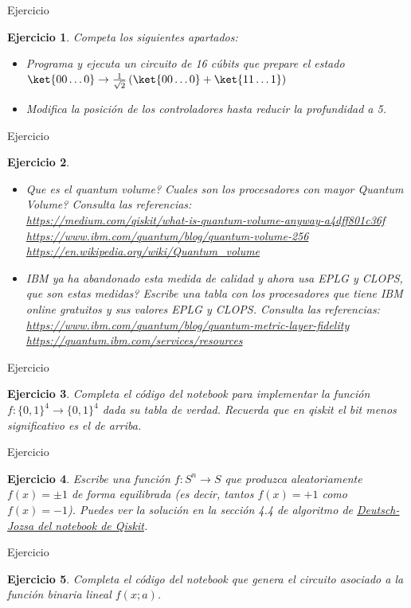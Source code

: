 \documentclass[a4paper,11pt]{book} %
\newtheorem{ejercicio_contador}{Ejercicio}
\newcommand{\Ejercicio}[1]{
		\begin{mybox_gray}{Ejercicio} 
			\begin{ejercicio_contador}
				 #1 
			\end{ejercicio_contador} 
		\end{mybox_gray}
	}
\numberwithin{equation}{chapter}
\begin{document}
\Ejercicio{
Competa los siguientes apartados:
\begin{itemize}
\item[1.] Programa y ejecuta un circuito de 16 cúbits que prepare el estado $\ket{00\ldots 0} \to \frac{1}{\sqrt{2}}\left(\ket{00\ldots 0} + \ket{11\ldots 1}\right) $
\item[2.] Modifica la posición de los controladores hasta reducir la profundidad a 5.
\end{itemize}
}

\Ejercicio{
\begin{itemize}
\item[a)]  Que es el quantum volume? Cuales son los procesadores con mayor Quantum Volume? Consulta las referencias:\\
\url{https://medium.com/qiskit/what-is-quantum-volume-anyway-a4dff801c36f}\\
\url{https://www.ibm.com/quantum/blog/quantum-volume-256}\\
\url{https://en.wikipedia.org/wiki/Quantum_volume}


\item[b)] IBM ya ha abandonado esta medida de calidad y ahora usa EPLG y CLOPS, que son estas medidas? Escribe una tabla con los procesadores que tiene IBM online gratuitos y sus valores EPLG y CLOPS. Consulta las referencias:\\
\url{https://www.ibm.com/quantum/blog/quantum-metric-layer-fidelity}\\
\url{https://quantum.ibm.com/services/resources}


\end{itemize}






}

\Ejercicio{
Completa el código del notebook para implementar la función $f:\{0,1\}^4\to \{0,1\}^4$ dada su tabla de verdad.
Recuerda que en qiskit el bit menos significativo es el de arriba.
}

\Ejercicio{
Escribe una función $f:S^n\to S$  que  produzca aleatoriamente $f(x) = \pm 1$ de forma \textit{equilibrada} (es decir, tantos $f(x)= +1$ como $f(x)= -1$).  Puedes ver la solución en la sección 4.4 de algoritmo de \href{https://learn.qiskit.org/course/ch-algorithms/deutsch-jozsa-algorithm}{Deutsch-Jozsa del notebook de Qiskit}.
}

\Ejercicio{
Completa el código del notebook que genera el circuito asociado a la función binaria lineal $f(x;a)$.
}
\end{document}
